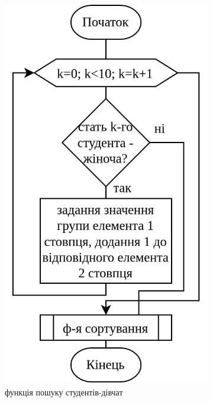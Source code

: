 \documentclass[12pt]{extreport}
\begin{document}
\begin{figure}[h]
\begin{subfigure}[b]{.3\textwidth}
		\includegraphics[width=.9\textwidth]{fch/femdetect.png}
		\caption{функція пошуку студентів-дівчат}
	\end{subfigure}
	\hfill
	\begin{subfigure}[b]{.3\textwidth}
	\centering

\end{subfigure}
\end{figure}
\end{document}
